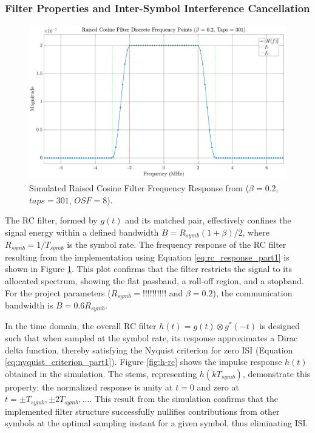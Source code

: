 \subsubsection{Filter Properties and Inter-Symbol Interference Cancellation}
\begin{figure}[H]
	\centering
	\includegraphics[width=0.9\linewidth]{Images/h-rc-freq} 
	\caption{Simulated Raised Cosine Filter Frequency Response from ($\beta = 0.2$, $taps = 301$, $OSF = 8$).}
	\label{fig:h-rc-freq}
\end{figure}
The RC filter, formed by $g(t)$ and its matched pair, effectively confines the signal energy within a defined bandwidth $B = R_{symb} (1+\beta)/2$, where $R_{symb} = 1/T_{symb}$ is the symbol rate. The frequency response of the RC filter resulting from the implementation using Equation \ref{eq:rc_response_part1} is shown in Figure \ref{fig:h-rc-freq}. This plot confirms that the filter restricts the signal to its allocated spectrum, showing the  flat passband, a roll-off region, and a stopband. For the project parameters ($R_{symb} = !!!!!!!!!!$ and $\beta = 0.2$), the communication bandwidth is $B = 0.6 R_{symb}$.


In the time domain, the overall RC filter $h(t) = g(t) \otimes g^*(-t)$ is designed such that when sampled at the symbol rate, its response approximates a Dirac delta function, thereby satisfying the Nyquist criterion for zero ISI (Equation \ref{eq:nyquist_criterion_part1}). Figure \ref{fig:h-rc} shows the impulse response $h(t)$ obtained in the simulation. The stems, representing $h(kT_{symb})$, demonstrate this property: the normalized response is unity at $t=0$ and zero at $t = \pm T_{symb}, \pm 2T_{symb}, \dots$. This result from the simulation confirms that the implemented filter structure successfully nullifies contributions from other symbols at the optimal sampling instant for a given symbol, thus eliminating ISI.

